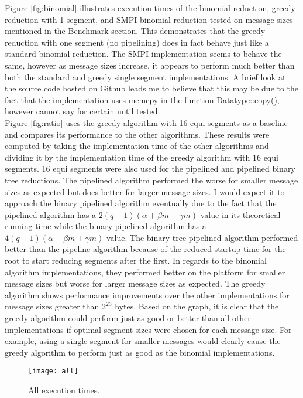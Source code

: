 \documentclass{article}
\begin{document}
Figure \ref{fig:binomial} illustrates execution times of the binomial reduction, greedy reduction with
1 segment, and SMPI binomial reduction tested on message sizes mentioned in the Benchmark section.
This demonstrates that the greedy reduction with one segment (no pipelining) does in fact behave just like
a standard binomial reduction. The SMPI implementation seems to behave the same, however as message
sizes increase, it appears to perform much better than both the standard and greedy single segment
implementations. A brief look at the source code hosted on Github leads me to believe that this may be
due to the fact that the implementation uses memcpy in the function Datatype::copy(), however cannot
say for certain until tested. \\

Figure \ref{fig:ratio} uses the greedy algorithm with 16 equi segments as a baseline and
compares its performance to the other algorithms. These results were computed by taking the
implementation time of the other algorithms and dividing it by the implementation time of the greedy
algorithm with 16 equi segments. 16 equi segments were also used for the pipelined and pipelined binary
tree reductions. The pipelined algorithm performed the worse for smaller message sizes as expected but
does better for larger message sizes. I would expect it to approach the binary pipelined algorithm
eventually due to the fact that the pipelined algorithm has a $2(q-1)(\alpha + \beta m + \gamma m)$ value in its
theoretical running time while the binary pipelined algorithm has a $4(q-1)(\alpha + \beta m + \gamma m)$ value. 
The binary tree pipelined algorithm performed better than the pipeline algorithm because of the reduced startup
time for
the root to start reducing segments after the first. In regards to the binomial algorithm implementations,
they performed better on the platform for smaller message sizes but worse for larger message sizes as
expected. The greedy algorithm shows performance improvements over the other implementations for
message sizes greater than $2^{23}$ bytes. Based on the graph, it is clear that the greedy algorithm could
perform just as good or better than all other implementations if optimal segment sizes were
chosen for each message size. For example, using a single segment for smaller messages would
clearly cause the greedy algorithm to perform just as good as the binomial implementations.


\begin{figure}[h]
    \centering
    \texttt{[image: all]}
    \caption{All execution times.}
    \label{fig:all}
\end{figure}
\end{document}
